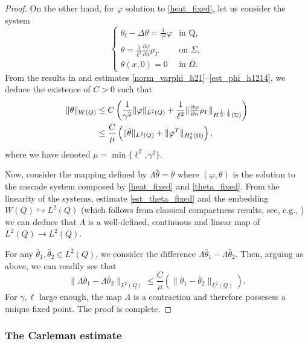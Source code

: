 \documentclass{aims}
\theoremstyle{definition}
\def\csbd{\rho_{\Gamma}}
\begin{document}
\begin{proof}
On the other hand, for $\varphi$ solution to \eqref{heat_fixed}, let us consider the system
%
\begin{equation}\label{theta_fixed}
\begin{cases}
\theta_t-\Delta \theta=\frac{1}{\gamma^2}\varphi & \text{in Q}, \\
\theta=\frac{1}{\ell^2}\frac{\partial \varphi}{\partial n}\csbd &\text{on } \Sigma, \\
\theta(x,0)=0 & \text{in } \Omega.
\end{cases}
\end{equation}
%
From the results in \cite[Ch. 4, \S15.5]{lions_magenes} and estimates \eqref{norm_varphi_h21}--\eqref{est_phi_h1214}, we deduce the existence of $C>0$ such that
%
\begin{align}\notag
\|\theta\|_{W(Q)}&\leq C\left(\frac{1}{\gamma^2}\|\varphi\|_{L^2(Q)}+\frac{1}{\ell^2}\|\tfrac{\partial \varphi}{\partial n}\csbd \|_{H^{\frac12,\frac14}(\Sigma)}\right) \\ \label{est_theta_fixed}
&\leq \frac{C}{\mu}\left(\|\bar\theta\|_{L^2(Q)}+\|\varphi^T\|_{H^{1}_0(\Omega)}\right),
\end{align}
%
where we have denoted $\mu=\min\{\ell^2,\gamma^2\}$.

Now, consider the mapping defined by $\Lambda\bar\theta=\theta$ where $(\varphi,\theta)$ is the solution to the cascade system composed by \eqref{heat_fixed} and \eqref{theta_fixed}. From the linearity of the systems, estimate \eqref{est_theta_fixed} and the embedding $W(Q)\hookrightarrow L^2(Q)$ (which follows from classical compactness results, see, e.g., \cite{simon}) we can deduce that $\Lambda$ is a well-defined, continuous and linear map of $L^2(Q)\to L^2(Q)$.

For any $\bar\theta_1,\bar\theta_2\in L^2(Q)$, we consider the difference $\Lambda\bar\theta_1-\Lambda\bar\theta_2$. Then, arguing as above, we can readily see that
%
\begin{equation*}
\|\Lambda \bar\theta_1-\Lambda \bar\theta_2\|_{L^2(Q)}\leq \frac{C}{\mu}\left(\|\bar\theta_1-\bar\theta_2\|_{L^2(Q)}\right).
\end{equation*}
%
For $\gamma,\ell$ large enough, the map $\Lambda$ is a contraction and therefore possesess a unique fixed point. The proof is complete. 
\end{proof}

\subsubsection*{The Carleman estimate}
\end{document}
